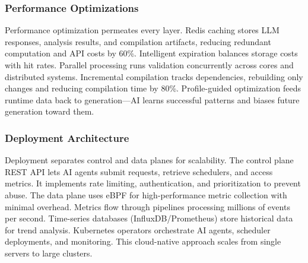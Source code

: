 \subsubsection{Performance Optimizations}
Performance optimization permeates every layer. Redis caching stores LLM responses, analysis results, and compilation artifacts, reducing redundant computation and API costs by 60\%. Intelligent expiration balances storage costs with hit rates. Parallel processing runs validation concurrently across cores and distributed systems. Incremental compilation tracks dependencies, rebuilding only changes and reducing compilation time by 80\%. Profile-guided optimization feeds runtime data back to generation—AI learns successful patterns and biases future generation toward them.

\subsubsection{Deployment Architecture}
Deployment separates control and data planes for scalability. The control plane REST API lets AI agents submit requests, retrieve schedulers, and access metrics. It implements rate limiting, authentication, and prioritization to prevent abuse. The data plane uses eBPF for high-performance metric collection with minimal overhead. Metrics flow through pipelines processing millions of events per second. Time-series databases (InfluxDB/Prometheus) store historical data for trend analysis. Kubernetes operators orchestrate AI agents, scheduler deployments, and monitoring. This cloud-native approach scales from single servers to large clusters.